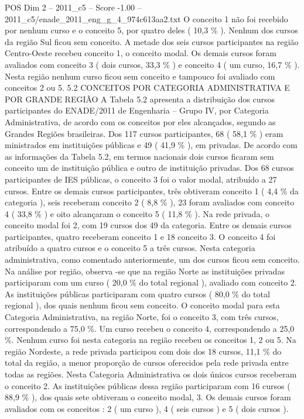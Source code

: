 \begin{textsample}{POS Dim 2 – 2011\_c5 – Score -1.00 – 2011\_c5/enade\_2011\_eng\_g\_4\_974c613aa2.txt}
O conceito 1 não foi recebido por nenhum curso e o conceito 5, por quatro deles ( 10,3 \% ).
Nenhum dos cursos da região Sul ficou sem conceito.
A metade dos seis cursos participantes na região Centro-Oeste recebeu conceito 1, o conceito modal.
Os demais cursos foram avaliados com conceito 3 ( dois cursos, 33,3 \% ) e conceito 4 ( um curso, 16,7 \% ).
Nesta região nenhum curso ficou sem conceito e tampouco foi avaliado com conceitos 2 ou 5. 5.2 CONCEITOS POR CATEGORIA ADMINISTRATIVA E POR GRANDE REGIÃO A Tabela 5.2 apresenta a distribuição dos cursos participantes do ENADE/2011 de Engenharia – Grupo IV, por Categoria Administrativa, de acordo com os conceitos por eles alcançados, segundo as Grandes Regiões brasileiras.
Dos 117 cursos participantes, 68 ( 58,1 \% ) eram ministrados em instituições públicas e 49 ( 41,9 \% ), em privadas.
De acordo com as informações da Tabela 5.2, em termos nacionais dois cursos ficaram sem conceito um de instituição pública e outro de instituição privadas.
Dos 68 cursos participantes de IES públicas, o conceito 3 foi o valor modal, atribuído a 27 cursos.
Entre os demais cursos participantes, três obtiveram conceito 1 ( 4,4 \% da categoria ), seis receberam conceito 2 ( 8,8 \% ), 23 foram avaliados com conceito 4 ( 33,8 \% ) e oito alcançaram o conceito 5 ( 11,8 \% ).
Na rede privada, o conceito modal foi 2, com 19 cursos dos 49 da categoria.
Entre os demais cursos participantes, quatro receberam conceito 1 e 18 conceito 3.
O conceito 4 foi atribuído a quatro cursos e o conceito 5 a três cursos.
Nesta categoria administrativa, como comentado anteriormente, um dos cursos ficou sem conceito.
Na análise por região, observa -se que na região Norte as instituições privadas participaram com um curso ( 20,0 \% do total regional ), avaliado com conceito 2.
As instituições públicas participaram com quatro cursos ( 80,0 \% do total regional ), dos quais nenhum ficou sem conceito.
O conceito modal para esta Categoria Administrativa, na região Norte, foi o conceito 3, com três cursos, correspondendo a 75,0 \%.
Um curso recebeu o conceito 4, correspondendo a 25,0 \%.
Nenhum curso foi nesta categoria na região recebeu os conceitos 1, 2 ou 5.
Na região Nordeste, a rede privada participou com dois dos 18 cursos, 11,1 \% do total da região, a menor proporção de cursos oferecidos pela rede privada entre todas as regiões.
Nesta Categoria Administrativa os dois únicos cursos receberam o conceito 2.
As instituições públicas dessa região participaram com 16 cursos ( 88,9 \% ), dos quais sete obtiveram o conceito modal, 3.
Os demais cursos foram avaliados com os conceitos : 2 ( um curso ), 4 ( seis cursos ) e 5 ( dois cursos ).

\end{textsample}
